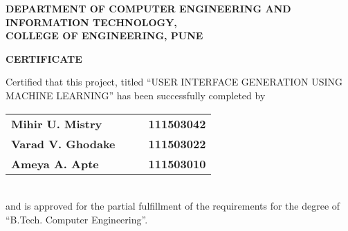 %
\thispagestyle{empty}
\linespread{2}
\begin{center}			%
	\Large{\bf{DEPARTMENT OF COMPUTER ENGINEERING AND\\  INFORMATION TECHNOLOGY,\\
	       COLLEGE OF ENGINEERING, PUNE\\}}
\end{center}

\vspace{20pt}			%

\begin{center}
	\Large{\bf{CERTIFICATE\\}}
\end{center}

\vspace{20pt}

\linespread{1.5}			%
\selectfont
\large{
Certified that this project, titled ``USER INTERFACE GENERATION USING MACHINE LEARNING''
has been successfully completed by \\
\begin{table}[htbp]
	\begin{center}
	\begin{tabular}{ l c c l }
	\Large\bf{Mihir U. Mistry} & & & \Large\bf{111503042} \\ [0.3cm]
	\Large\bf{Varad V. Ghodake} & & & \Large\bf{111503022} \\ [0.3cm]
	\Large\bf{Ameya A. Apte} & & & \Large\bf{111503010} \\
	\end{tabular}
	\end{center}
	\end{table} \\
and is approved for the partial fulfillment of the requirements for the degree of
``B.Tech. Computer Engineering''.
}

\vspace{60pt}

